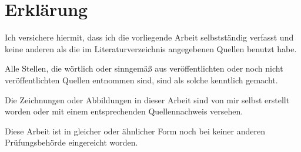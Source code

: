 \chapter*{Erklärung}
\thispagestyle{empty}
\noindent
Ich versichere hiermit, dass ich die vorliegende Arbeit selbstständig verfasst und keine anderen als die im Literaturverzeichnis angegebenen Quellen benutzt habe.

Alle Stellen, die wörtlich oder sinngemäß aus veröffentlichten oder noch nicht veröffentlichten Quellen entnommen sind, sind als solche kenntlich gemacht.

Die Zeichnungen oder Abbildungen in dieser Arbeit sind von mir selbst erstellt worden oder mit einem entsprechenden Quellennachweis versehen.

Diese Arbeit ist in gleicher oder ähnlicher Form noch bei keiner anderen Prüfungsbehörde eingereicht worden.

\bigskip
\bigskip
\bigskip
\noindent
\myTime \hfill \underline{\hspace{8cm}} \\[0.3em]
\hfill \makebox[21cm]{\myName}